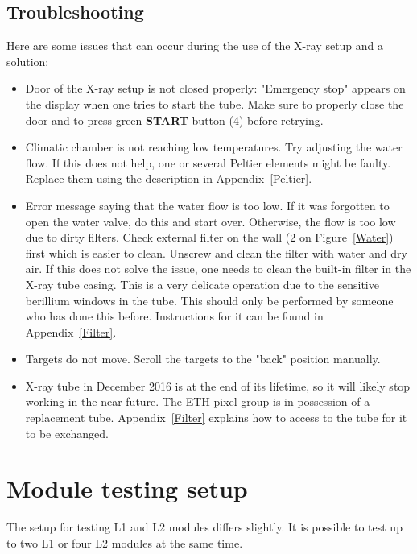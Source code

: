 \documentclass[a4paper,12pt,twoside]{article}
\begin{document}
\subsection{Troubleshooting}
Here are some issues that can occur during the use of the X-ray setup and a solution:
\begin{itemize}
\item Door of the X-ray setup is not closed properly: "Emergency stop" appears on the display when one tries to start the tube. Make sure to properly close the door and to press green \textbf{START} button (4) before retrying.
\item Climatic chamber is not reaching low temperatures. Try adjusting the water flow. If this does not help, one or several Peltier elements might be faulty. Replace them using the description in Appendix~\ref{Peltier}.
\item Error message saying that the water flow is too low. If it was forgotten to open the water valve, do this and start over. Otherwise, the flow is too low due to dirty filters. Check external filter on the wall (2 on Figure~\ref{Water}) first which is easier to clean. Unscrew and clean the filter with water and dry air. If this does not solve the issue, one needs to clean the built-in filter in the X-ray tube casing. This is a very delicate operation due to the sensitive berillium windows in the tube. This should only be performed by someone who has done this before. Instructions for it can be found in Appendix~\ref{Filter}.
\item Targets do not move. Scroll the targets to the "back" position manually.
\item X-ray tube in December 2016 is at the end of its lifetime, so it will likely stop working in the near future. The ETH pixel group is in possession of a replacement tube. Appendix~\ref{Filter} explains how to access to the tube for it to be exchanged. 
\end{itemize}


\section{Module testing setup}

The setup for testing L1 and L2 modules differs slightly. It is possible to test up to two L1 or four L2 modules at the same time.
\end{document}
